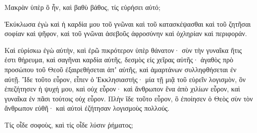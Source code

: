 {Μακρὰν ὑπὲρ ὃ ἦν, καὶ βαθὺ βάθος, τίς εὑρήσει αὐτό;
\par }{\PP {}Ἐκύκλωσα ἐγὼ καὶ ἡ καρδία μου τοῦ γνῶναι καὶ τοῦ κατασκέψασθαι καὶ τοῦ ζητῆσαι σοφίαν καὶ ψῆφον, καὶ τοῦ γνῶναι ἀσεβοῦς ἀφροσύνην καὶ ὀχληρίαν καὶ περιφοράν.
\par }{\PP {}Καὶ εὑρίσκω ἐγὼ αὐτὴν, καὶ ἐρῶ πικρότερον ὑπὲρ θάνατον· σὺν τὴν γυναῖκα ἥτις ἐστι θήρευμα, καὶ σαγῆναι καρδία αὐτῆς, δεσμὸς εἰς χεῖρας αὐτῆς· ἀγαθὸς πρὸ προσώπου τοῦ Θεοῦ ἐξαιρεθήσεται ἀπʼ αὐτῆς, καὶ ἁμαρτάνων συλληφθήσεται ἐν αὐτῇ.
Ἴδε τοῦτο εὗρον, εἶπεν ὁ Ἐκκλησιαστής· μία τῇ μιᾷ τοῦ εὑρεῖν λογισμὸν,
ὃν ἐπεζήτησεν ἡ ψυχή μου, καὶ οὐχ εὗρον· καὶ ἄνθρωπον ἕνα ἀπὸ χιλίων εὗρον, καὶ γυναῖκα ἐν πᾶσι τούτοις οὐχ εὗρον.
Πλὴν ἴδε τοῦτο εὗρον, ὃ ἐποίησεν ὁ Θεὸς σὺν τὸν ἄνθρωπον εὐθῆ· καὶ αὐτοὶ ἐζήτησαν λογισμοὺς πολλούς.
\par }{\PP Τίς οἶδε σοφοὺς, καὶ τίς οἶδε λύσιν ῥήματος;

}
